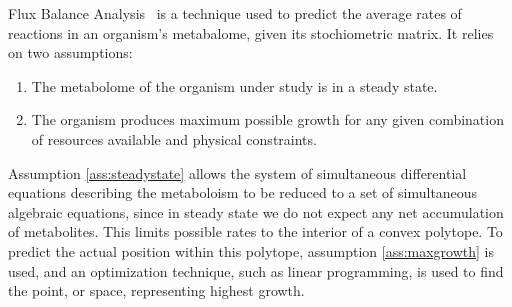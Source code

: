 Flux Balance Analysis~\cite{Orth2010} is a technique used to predict the average rates of reactions in an organism's metabalome, given its stochiometric matrix.
It relies on two assumptions:
\begin{enumerate}
\item \label{ass:steadystate} The metabolome of the organism under study is in a steady state.
\item \label{ass:maxgrowth} The organism produces maximum possible growth for any given combination of resources available and physical constraints.
\end{enumerate}
Assumption \ref{ass:steadystate} allows the system of simultaneous differential equations describing the metaboloism to be reduced to a set of simultaneous algebraic equations, since in steady state we do not expect any net accumulation of metabolites. 
This limits possible rates to the interior of a convex polytope. 
To predict the actual position within this polytope, assumption \ref{ass:maxgrowth} is used, and an optimization technique, such as linear programming, is used to find the point, or space, representing highest growth.